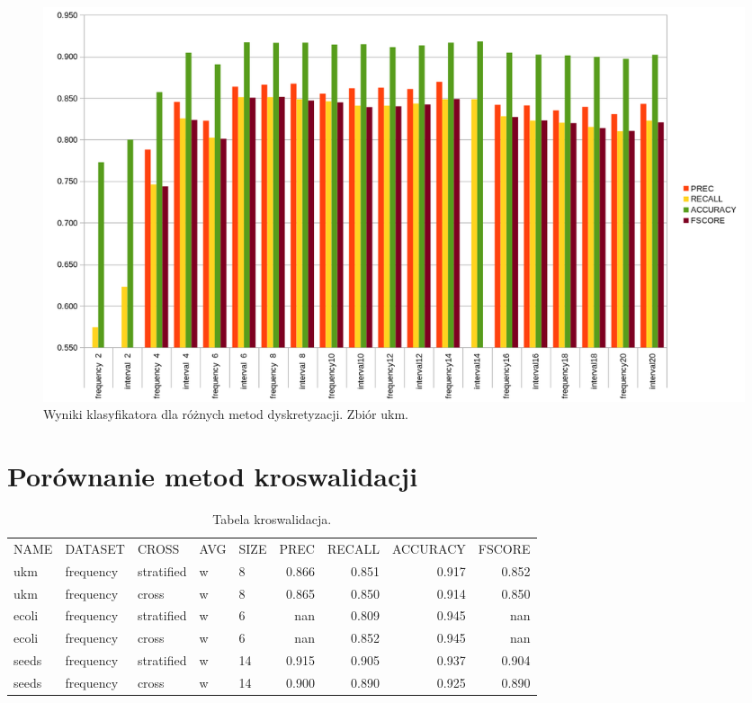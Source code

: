 \begin{figure}[H]
	\centering
		\includegraphics[width=1.0\linewidth]{disc_ukm.png}
	\caption[Wyniki klasyfikatora dla różnych metod dyskretyzacji. Zbiór ukm.]{Wyniki klasyfikatora dla różnych metod dyskretyzacji. Zbiór ukm.}
	\label{fig:disc_ukm}
\end{figure}

\section{Porównanie metod kroswalidacji}

\begin{table}[H]
\centering
\caption{Tabela kroswalidacja.}
\label{table-cross}
\begin{tabular}{lllllrrrr}
NAME  & DATASET   & CROSS      & AVG & SIZE & PREC  & RECALL & ACCURACY & FSCORE \\
ukm   & frequency & stratified & w   & 8    & 0.866 & 0.851  & 0.917    & 0.852  \\
ukm   & frequency & cross      & w   & 8    & 0.865 & 0.850  & 0.914    & 0.850  \\
ecoli & frequency & stratified & w   & 6    & nan   & 0.809  & 0.945    & nan    \\
ecoli & frequency & cross      & w   & 6    & nan   & 0.852  & 0.945    & nan    \\
seeds & frequency & stratified & w   & 14   & 0.915 & 0.905  & 0.937    & 0.904  \\
seeds & frequency & cross      & w   & 14   & 0.900 & 0.890  & 0.925    & 0.890 
\end{tabular}
\end{table}

